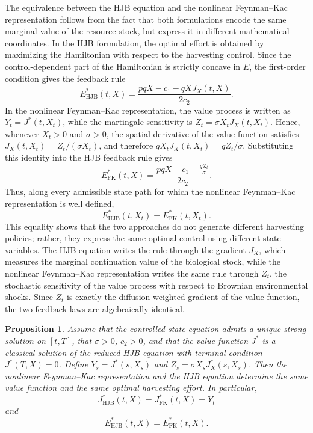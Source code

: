 \documentclass[11pt]{article}
\newtheorem{prop}[theorem]{\bf Proposition}
\begin{document}
	The equivalence between the HJB equation and the nonlinear Feynman--Kac representation follows from the fact that both formulations encode the same marginal value of the resource stock, but express it in different mathematical coordinates. In the HJB formulation, the optimal effort is obtained by maximizing the Hamiltonian with respect to the harvesting control. Since the control-dependent part of the Hamiltonian is strictly concave in $E$, the first-order condition gives the feedback rule
	\[
	E^*_{\mathrm{HJB}}(t,X)=\frac{pqX-c_1-qXJ_X(t,X)}{2c_2}.
	\]
	In the nonlinear Feynman--Kac representation, the value process is written as $Y_t=J^*(t,X_t)$, while the martingale sensitivity is $Z_t=\sigma X_tJ_X(t,X_t)$. Hence, whenever $X_t>0$ and $\sigma>0$, the spatial derivative of the value function satisfies $J_X(t,X_t)=Z_t/(\sigma X_t)$, and therefore $qX_tJ_X(t,X_t)=qZ_t/\sigma$. Substituting this identity into the HJB feedback rule gives
	\[
	E^*_{\mathrm{FK}}(t,X)
	=
	\frac{pqX-c_1-\frac{qZ_t}{\sigma}}{2c_2}.
	\]
	Thus, along every admissible state path for which the nonlinear Feynman--Kac representation is well defined,
	\[
	E^*_{\mathrm{HJB}}(t,X_t)=E^*_{\mathrm{FK}}(t,X_t).
	\]
	This equality shows that the two approaches do not generate different harvesting policies; rather, they express the same optimal control using different state variables. The HJB equation writes the rule through the gradient $J_X$, which measures the marginal continuation value of the biological stock, while the nonlinear Feynman--Kac representation writes the same rule through $Z_t$, the stochastic sensitivity of the value process with respect to Brownian environmental shocks. Since $Z_t$ is exactly the diffusion-weighted gradient of the value function, the two feedback laws are algebraically identical.
	
	\begin{prop}\label{p4}
		Assume that the controlled state equation admits a unique strong solution on $[t,T]$, that $\sigma>0$, $c_2>0$, and that the value function $J^*$ is a classical solution of the reduced HJB equation with terminal condition $J^*(T,X)=0$. Define $Y_s=J^*(s,X_s)$ and $Z_s=\sigma X_sJ_X^*(s,X_s)$. Then the nonlinear Feynman--Kac representation and the HJB equation determine the same value function and the same optimal harvesting effort. In particular,
		\[
		J^*_{\mathrm{HJB}}(t,X)=J^*_{\mathrm{FK}}(t,X)=Y_t
		\]
		and
		\[
		E^*_{\mathrm{HJB}}(t,X)
		=
		E^*_{\mathrm{FK}}(t,X).
		\]
	\end{prop}
	
\end{document}

